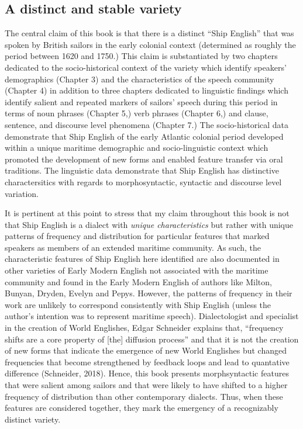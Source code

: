\subsection{{A} {distinct} {and} {stable} {variety}}%

  The central claim of this book is that there is a distinct “Ship English” that was spoken by British sailors in the early colonial context (determined as roughly the period between 1620 and 1750.) This claim is substantiated by two chapters dedicated to the socio-historical context of the variety which identify speakers’ demographics (Chapter 3) and the characteristics of the speech community (Chapter 4) in addition to three chapters dedicated to linguistic findings which identify salient and repeated markers of sailors’ speech during this period in terms of noun phrases (Chapter 5,) verb phrases (Chapter 6,) and clause, sentence, and discourse level phenomena (Chapter 7.) The socio-historical data demonstrate that Ship English of the early Atlantic colonial period developed within a unique maritime demographic and socio-linguistic context which promoted the development of new forms and enabled feature transfer via oral traditions. The linguistic data demonstrate that Ship English has distinctive charactersitics with regards to morphosyntactic, syntactic and discourse level variation.

  It is pertinent at this point to stress that my claim throughout this book is not that Ship English is a dialect with \textit{unique characteristics} but rather with unique patterns of frequency and distribution for particular features that marked speakers as members of an extended maritime community. As such, the characteristic features of Ship English here identified are also documented in other varieties of Early Modern English not associated with the maritime community and found in the Early Modern English of authors like Milton, Bunyan, Dryden, Evelyn and Pepys. However, the patterns of frequency in their work are unlikely to correspond consistently with Ship English (unless the author’s intention was to represent maritime speech). Dialectologist and specialist in the creation of World Englishes, Edgar Schneider explains that, “frequency shifts are a core property of [the] diffusion process” and that it is not the creation of new forms that indicate the emergence of new World Englishes but changed frequencies that become strengthened by feedback loops and lead to quantative difference (Schneider, 2018). Hence, this book presents morphsyntactic features that were salient among sailors and that were likely to have shifted to a higher frequency of distribution than other contemporary dialects. Thus, when these features are considered together, they mark the emergency of a recognizably distinct variety. 

